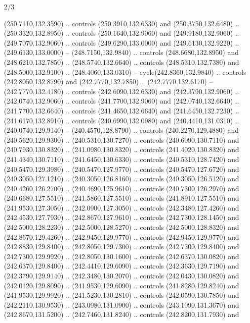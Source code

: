\begin{flagdescription}{2/3}
\begin{scope}[xshift=0.5\flaglength,yshift=0.5\flagwidth,scale=\flagwidth/259.2]
\begin{scope}[y=0.8pt, x=0.8pt, yscale=-1,shift={(-243,-162)}]
      (250.7110,132.3590) .. controls (250.3910,132.6330) and (250.3750,132.6480) ..
      (250.3320,132.8950) .. controls (250.1640,132.9060) and (249.9180,132.9060) ..
      (249.7070,132.9060) .. controls (249.6290,133.0000) and (249.6130,132.9220) ..
      (249.6130,133.0000) -- (248.7150,132.9840) .. controls (248.6680,132.8950) and
      (248.6210,132.7850) .. (248.5740,132.6640) .. controls (248.5310,132.7380) and
      (248.5000,132.9100) .. (248.4060,133.0310) -- cycle(242.8360,132.9840) ..
      controls (242.8050,132.8790) and (242.7770,132.7850) .. (242.7770,132.6170) --
      (242.7770,132.4180) .. controls (242.6090,132.6330) and (242.3790,132.9060) ..
      (242.0740,132.9060) .. controls (241.7700,132.9060) and (242.0740,132.6640) ..
      (241.7700,132.6640) .. controls (241.4650,132.6640) and (241.6450,132.7230) ..
      (241.6170,132.8910) .. controls (240.6990,132.0980) and (240.4410,131.0310) ..
      (240.0740,129.9140) -- (240.4570,128.8790) .. controls (240.2270,129.4880) and
      (240.5620,129.9300) .. (240.5310,130.7270) .. controls (240.6090,130.7110) and
      (240.7930,130.8320) .. (241.0980,130.8320) .. controls (241.4020,130.8320) and
      (241.4340,130.7110) .. (241.6450,130.6330) .. controls (240.5310,128.7420) and
      (240.5470,129.3980) .. (240.5470,127.9770) .. controls (240.5470,127.6720) and
      (240.3050,127.1210) .. (240.3050,126.8160) .. controls (240.3050,126.5120) and
      (240.4260,126.2700) .. (240.4690,125.9610) .. controls (240.7300,126.2970) and
      (240.6680,127.5510) .. (241.5860,127.5510) .. controls (241.8910,127.5510) and
      (241.9530,127.3050) .. (242.0900,127.3050) .. controls (242.3480,127.4260) and
      (242.4530,127.7930) .. (242.8670,127.9610) .. controls (242.7300,128.1450) and
      (242.5000,128.2230) .. (242.5000,128.5270) .. controls (242.5000,128.8320) and
      (242.8670,129.4260) .. (242.9450,129.9770) .. controls (242.9450,129.9770) and
      (242.8830,129.8400) .. (242.8050,129.7300) .. controls (242.7300,129.8400) and
      (242.7300,129.9920) .. (242.8050,130.1600) .. controls (242.6370,130.0820) and
      (242.6370,129.8400) .. (242.4410,129.6090) .. controls (242.3630,129.7190) and
      (242.3790,129.9140) .. (242.3480,130.2070) .. controls (242.0430,130.0820) and
      (242.0120,129.8090) .. (241.9530,129.6090) .. controls (241.8280,129.8240) and
      (241.9530,129.9920) .. (241.5230,130.2810) .. controls (242.0590,130.7850) and
      (242.2110,130.9530) .. (243.0980,131.0900) .. controls (243.1090,131.3670) and
      (242.8670,131.5200) .. (242.7460,131.8240) .. controls (242.8200,131.7930) and

\end{scope}
\end{scope}
\end{flagdescription}

